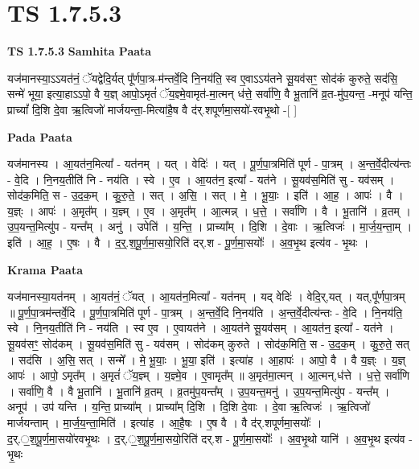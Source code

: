 \documentclass[17pt]{extarticle}
\begin{document}
\section*{ TS 1.7.5.3 }

\textbf{TS 1.7.5.3 } \newline
\textbf{Samhita Paata} \newline

यज॑मानस्या॒ऽऽयत॑नं॒ ॅयद्वेदि॒र्यत् पू᳚र्णपा॒त्र-म॑न्तर्वे॒दि नि॒नय॑ति॒ स्व ए॒वाऽऽय॑तने सू॒यव॑सꣳ॒॒ सोद॑कं कुरुते॒ सद॑सि॒ सन्मे॑ भूया॒ इत्या॒हाऽऽपो॒ वै य॒ज्ञ् आपो॒ऽमृतं॑ ॅय॒ज्ञ्मे॒वामृत॑-मा॒त्मन् ध॑त्ते॒ सर्वा॑णि॒ वै भू॒तानि॑ व्र॒त-मु॑प॒यन्त॒ -मनूप॑ यन्ति॒ प्राच्यां᳚ दि॒शि दे॒वा ऋ॒त्विजो॑ मार्जयन्ता॒-मित्या॑है॒ष वै द॑र्.शपूर्णमा॒सयो॑-रवभृ॒थो -[ ] \newline

\textbf{Pada Paata} \newline

यज॑मानस्य । आ॒यत॑न॒मित्या᳚ - यत॑नम् । यत् । वेदिः॑ । यत् । पू॒र्ण॒पा॒त्रमिति॑ पूर्ण - पा॒त्रम् । अ॒न्त॒र्वे॒दीत्य॑न्तः - वे॒दि । नि॒नय॒तीति॑ नि - नय॑ति । स्वे । ए॒व । आ॒यत॑न॒ इत्या᳚ - यत॑ने । सू॒यव॑स॒मिति॑ सु - यव॑सम् । सोद॑क॒मिति॒ स - उ॒द॒क॒म् । कु॒रु॒ते॒ । सत् । अ॒सि॒ । सत् । मे॒ । भू॒याः॒ । इति॑ । आ॒ह॒ । आपः॑ । वै । य॒ज्ञ्ः । आपः॑ । अ॒मृत᳚म् । य॒ज्ञ्म् । ए॒व । अ॒मृत᳚म् । आ॒त्मन्न् । ध॒त्ते॒ । सर्वा॑णि । वै । भू॒तानि॑ । व्र॒तम् । उ॒प॒यन्त॒मित्यु॑प - यन्त᳚म् । अनु॑ । उपेति॑ । य॒न्ति॒ । प्राच्या᳚म् । दि॒शि । दे॒वाः । ऋ॒त्विजः॑ । मा॒र्ज॒य॒न्ता॒म् । इति॑ । आ॒ह॒ । ए॒षः । वै । द॒र्॒.श॒पू॒र्ण॒मा॒सयो॒रिति॑ दर्.श - पू॒र्ण॒मा॒सयोः᳚ । अ॒व॒भृ॒थ इत्य॑व - भृ॒थः ।  \newline


\textbf{Krama Paata} \newline

यज॑मानस्या॒यत॑नम् । आ॒यत॑नं॒ ॅयत् । आ॒यत॑न॒मित्या᳚ - यत॑नम् । यद् वेदिः॑ । वेदि॒र्,यत् । यत्,पू᳚र्णपा॒त्रम् ॥ पू॒र्ण॒पा॒त्रम॑न्तर्वे॒दि । पू॒र्ण॒पा॒त्रमिति॑ पूर्ण - पा॒त्रम् । अ॒न्त॒र्वे॒दि नि॒नय॑ति । अ॒न्त॒र्वे॒दीत्य॑न्तः - वे॒दि । नि॒नय॑ति॒ स्वे । नि॒नय॒तीति॑ नि - नय॑ति । स्व ए॒व । ए॒वायत॑ने । आ॒यत॑ने सू॒यव॑सम् । आ॒यत॑न॒ इत्या᳚ - यत॑ने । सू॒यव॑सꣳ॒॒ सोद॑कम् । सू॒यव॑स॒मिति॑ सु - यव॑सम् । सोद॑कम् कुरुते । सोद॑क॒मिति॒ स - उ॒द॒क॒म् । कु॒रु॒ते॒ सत् । सद॑सि । अ॒सि॒ सत् । सन्मे᳚ । मे॒ भू॒याः॒ । भू॒या॒ इति॑ । इत्या॑ह । आ॒हापः॑ । आपो॒ वै । वै य॒ज्ञ्ः । य॒ज्ञ् आपः॑ । आपो॒ ऽमृत᳚म् । अ॒मृतं॑ ॅय॒ज्ञ्म् । य॒ज्ञ्मे॒व । ए॒वामृत᳚म् ॥ अ॒मृत॑मा॒त्मन् । आ॒त्मन्,ध॑त्ते । ध॒त्ते॒ सर्वा॑णि । सर्वा॑णि॒ वै । वै भू॒तानि॑ । भू॒तानि॑ व्र॒तम् । व्र॒तमु॑प॒यन्त᳚म् । उ॒प॒यन्त॒मनु॑ । उ॒प॒यन्त॒मित्यु॑प - यन्त᳚म् । अनूप॑ । उप॑ यन्ति । य॒न्ति॒ प्राच्या᳚म् । प्राच्या᳚म् दि॒शि । दि॒शि दे॒वाः । दे॒वा ऋ॒त्विजः॑ । ऋ॒त्विजो॑ मार्जयन्ताम् । मा॒र्ज॒य॒न्ता॒मिति॑ । इत्या॑ह । आ॒है॒षः । ए॒ष वै । वै द॑र्.शपूर्णमा॒सयोः᳚ । द॒र्.॒॒श॒पू॒र्ण॒मा॒सयो॑रवभृ॒थः । द॒र्.॒॒श॒पू॒र्ण॒मा॒सयो॒रिति॑ दर्.श - पू॒र्ण॒मा॒सयोः᳚ । अ॒व॒भृ॒थो यानि॑ । अ॒व॒भृ॒थ इत्य॑व - भृ॒थः \newline
\end{document}
